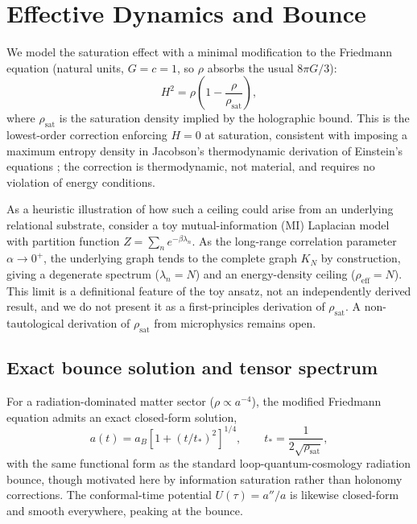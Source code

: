 \documentclass[onecolumn,PRD,amsmath,amssymb,aps,nofootinbib,superscriptaddress,11pt]{revtex4-2}
\begin{document}
\section{Effective Dynamics and Bounce}
We model the saturation effect with a minimal modification to the Friedmann equation (natural units, $G=c=1$, so $\rho$ absorbs the usual $8\pi G/3$):
\begin{equation}
H^2 = \rho\left(1 - \frac{\rho}{\rho_{\text{sat}}}\right),
\end{equation}
where $\rho_{\text{sat}}$ is the saturation density implied by the holographic bound. This is the lowest-order correction enforcing $H=0$ at saturation, consistent with imposing a maximum entropy density in Jacobson's thermodynamic derivation of Einstein's equations \cite{Jacobson1995}; the correction is thermodynamic, not material, and requires no violation of energy conditions.

As a heuristic illustration of how such a ceiling could arise from an underlying relational substrate, consider a toy mutual-information (MI) Laplacian model with partition function $Z=\sum_n e^{-\beta\lambda_n}$. As the long-range correlation parameter $\alpha\to0^+$, the underlying graph tends to the complete graph $K_N$ by construction, giving a degenerate spectrum ($\lambda_n=N$) and an energy-density ceiling ($\rho_{\text{eff}}=N$). This limit is a definitional feature of the toy ansatz, not an independently derived result, and we do not present it as a first-principles derivation of $\rho_{\text{sat}}$. A non-tautological derivation of $\rho_{\text{sat}}$ from microphysics remains open.

\subsection{Exact bounce solution and tensor spectrum}
For a radiation-dominated matter sector ($\rho\propto a^{-4}$), the modified Friedmann equation admits an exact closed-form solution,
\begin{equation}
a(t) = a_B\left[1+(t/t_\ast)^2\right]^{1/4}, \qquad t_\ast = \frac{1}{2\sqrt{\rho_{\text{sat}}}},
\end{equation}
with the same functional form as the standard loop-quantum-cosmology radiation bounce, though motivated here by information saturation rather than holonomy corrections. The conformal-time potential $U(\tau)=a''/a$ is likewise closed-form and smooth everywhere, peaking at the bounce.
\end{document}
